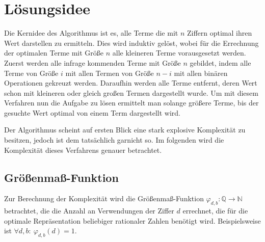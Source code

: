 \documentclass{article}
\theoremstyle{nonumberplain}
\begin{document}
    
\section{Lösungsidee}

Die Kernidee des Algorithmus ist es, alle Terme die mit \(n\) Ziffern optimal ihren Wert darstellen zu ermitteln.
Dies wird induktiv gelöst, wobei für die Errechnung der optimalen Terme mit Größe \(n\) alle kleineren Terme vorausgesetzt werden.
Zuerst werden alle infrage kommenden Terme mit Größe \(n\) gebildet, indem alle Terme von Größe \(i\) mit allen Termen von Größe \(n-i\) mit allen binären Operationen gekreuzt werden.
Daraufhin werden alle Terme entfernt, deren Wert schon mit kleineren oder gleich großen Termen dargestellt wurde.
Um mit diesem Verfahren nun die Aufgabe zu lösen ermittelt man solange größere Terme, bis der gesuchte Wert optimal von einem Term dargestellt wird.

Der Algorithmus scheint auf ersten Blick eine stark explosive Komplexität zu besitzen, jedoch ist dem tatsächlich garnicht so.
Im folgenden wird die Komplexität dieses Verfahrens genauer betrachtet.

\newcommand{\fad}{\forall d, b:\ }
\newcommand{\measure}[1]{\varphi_{d,b}\left(#1\right)}

\subsection{Größenmaß-Funktion}

Zur Berechnung der Komplexität wird die Größenmaß-Funktion \(\varphi_{d,b} : \mathbb{Q} \to \mathbb{N}\) betrachtet, die die Anzahl an Verwendungen der Ziffer \(d\) errechnet, die für die optimale Repräsentation beliebiger rationaler Zahlen benötigt wird.
Beispielsweise ist \(\fad\measure{d} = 1\).
\end{document}
